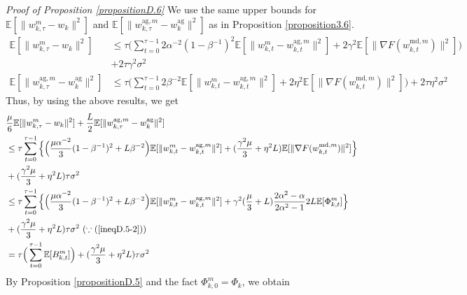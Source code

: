\emph{Proof of Proposition \ref{propositionD.6}} \textrm{ } We use the same upper bounds for $\mathbb{E}[\|w_{k, \tau}^m - w_k\|^2]$ and $\mathbb{E}[\|w_{k, \tau}^{\textrm{ag}, m} - w_k^{\textrm{ag}}\|^2]$ as in Proposition \ref{proposition3.6}.
\begin{align*}
    \mathbb{E}[\|w_{k, \tau}^m - w_k\|^2] &\leq \tau \Big(\sum_{t=0}^{\tau-1} 2\alpha^{-2}(1-\beta^{-1})^2\mathbb{E}[\|w_{k, t}^m- w_{k, t}^{\textrm{ag}, m}\|^2 ] + 2\gamma^2\mathbb{E}[\|\nabla F(w_{k, t}^{\textrm{md}, m})\|^2]\Big) \\
    &+2\tau\gamma^2\sigma^2 \\
    \mathbb{E}[\|w_{k, \tau}^{\textrm{ag}, m} - w_k^{\textrm{ag}}\|^2] &\leq \tau \Big(\sum_{t=0}^{\tau-1} 2\beta^{-2}\mathbb{E}[\|w_{k, t}^m - w_{k, t}^{\textrm{ag}, m}\|^2] + 2\eta^2\mathbb{E}[\|\nabla F(w_{k, t}^{\textrm{md}, m})\|^2]\Big) +2\tau\eta^2\sigma^2
\end{align*}
Thus, by using the above results, we get
\begin{align*}
    &\frac{\mu}{6}\mathbb{E}[\|w_{k, \tau}^m - w_k\|^2] + \frac{L}{2} \mathbb{E}[\|w_{k, \tau}^{\textrm{ag}, m} - w_k^{\textrm{ag}}\|^2] \\
    &\leq \tau \sum_{t=0}^{\tau-1} \Big\{ \Big(\frac{\mu\alpha^{-2}}{3}(1-\beta^{-1})^2 + L\beta^{-2}\Big)\mathbb{E}[\|w_{k, t}^m - w_{k, t}^{\textrm{ag}, m}\|^2] + (\frac{\gamma^2\mu}{3} + \eta^2 L)\mathbb{E}[\|\nabla F(w_{k, t}^{\textrm{md}, m})\|^2]\Big\} \\
    &+ (\frac{\gamma^2\mu}{3}+\eta^2 L)\tau\sigma^2 \\
    &\leq \tau \sum_{t=0}^{\tau-1} \Big\{ \Big(\frac{\mu\alpha^{-2}}{3}(1-\beta^{-1})^2 + L\beta^{-2}\Big)\mathbb{E}[\|w_{k, t}^m - w_{k, t}^{\textrm{ag}, m}\|^2] + \gamma^2(\frac{\mu}{3}+L)\frac{2\alpha^2-\alpha}{2\alpha^2-1}2L\mathbb{E}[\Phi_{k, t}^m]\Big\} \\
    &+ (\frac{\gamma^2\mu}{3}+\eta^2 L)\tau\sigma^2 \textrm{ }(\because (\ref{ineqD.5-2})) \\
    &= \tau \Big( \sum_{t=0}^{\tau-1} \mathbb{E}[B_{k, t}^m]\Big) + (\frac{\gamma^2\mu}{3}+\eta^2 L)\tau\sigma^2
\end{align*}
By Proposition \ref{propositionD.5} and the fact $\Phi_{k, 0}^m = \Phi_k$, we obtain
